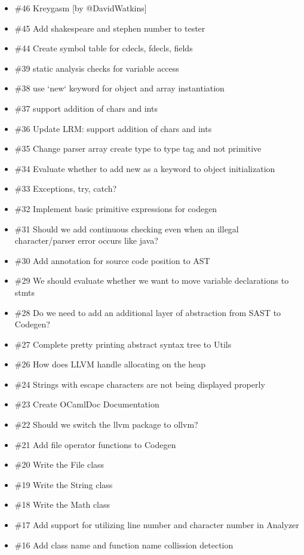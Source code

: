 \begin{homeworkProblem}
\begin{itemize}
		\item \#46 Kreygasm [by @DavidWatkins]
		\item \#45 Add shakespeare and stephen number to tester
		\item \#44 Create symbol table for cdecls, fdecls, fields
		\item \#39 static analysis checks for variable access
		\item \#38 use `new` keyword for object and array instantiation
		\item \#37 support addition of chars and ints
		\item \#36 Update LRM: support addition of chars and ints
		\item \#35 Change parser array create type to type tag and not primitive
		\item \#34 Evaluate whether to add new as a keyword to object initialization
		\item \#33 Exceptions, try, catch?
		\item \#32 Implement basic primitive expressions for codegen
		\item \#31 Should we add continuous checking even when an illegal character/parser error occurs like java?
		\item \#30 Add annotation for source code position to AST
		\item \#29 We should evaluate whether we want to move variable declarations to stmts
		\item \#28 Do we need to add an additional layer of abstraction from SAST to Codegen?
		\item \#27 Complete pretty printing abstract syntax tree to Utils
		\item \#26 How does LLVM handle allocating on the heap
		\item \#24 Strings with escape characters are not being displayed properly
		\item \#23 Create OCamlDoc Documentation
		\item \#22 Should we switch the llvm package to ollvm?
		\item \#21 Add file operator functions to Codegen
		\item \#20 Write the File class
		\item \#19 Write the String class
		\item \#18 Write the Math class
		\item \#17 Add support for utilizing line number and character number in Analyzer
		\item \#16 Add class name and function name collission detection

\end{itemize}
\end{homeworkProblem}
